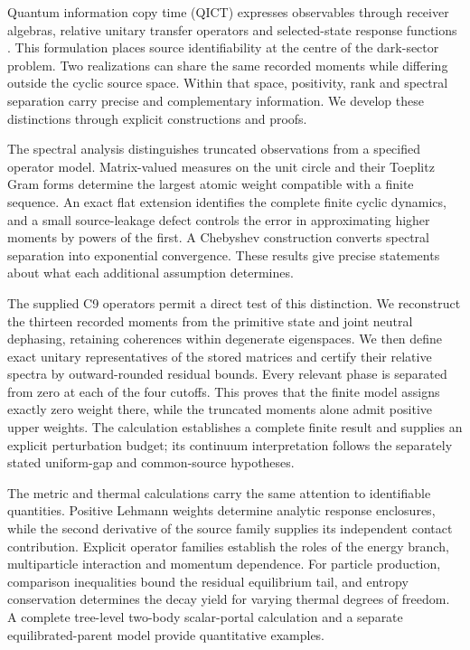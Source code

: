 \documentclass[11pt,a4paper]{article}
\numberwithin{equation}{section}
\begin{document}
Quantum information copy time (QICT) expresses observables through receiver algebras, relative unitary transfer operators and selected-state response functions \cite{QICT}. This formulation places source identifiability at the centre of the dark-sector problem. Two realizations can share the same recorded moments while differing outside the cyclic source space. Within that space, positivity, rank and spectral separation carry precise and complementary information. We develop these distinctions through explicit constructions and proofs.

The spectral analysis distinguishes truncated observations from a specified operator model. Matrix-valued measures on the unit circle and their Toeplitz Gram forms determine the largest atomic weight compatible with a finite sequence. An exact flat extension identifies the complete finite cyclic dynamics, and a small source-leakage defect controls the error in approximating higher moments by powers of the first. A Chebyshev construction converts spectral separation into exponential convergence. These results give precise statements about what each additional assumption determines.

The supplied C9 operators permit a direct test of this distinction. We reconstruct the thirteen recorded moments from the primitive state and joint neutral dephasing, retaining coherences within degenerate eigenspaces. We then define exact unitary representatives of the stored matrices and certify their relative spectra by outward-rounded residual bounds. Every relevant phase is separated from zero at each of the four cutoffs. This proves that the finite model assigns exactly zero weight there, while the truncated moments alone admit positive upper weights. The calculation establishes a complete finite result and supplies an explicit perturbation budget; its continuum interpretation follows the separately stated uniform-gap and common-source hypotheses.

The metric and thermal calculations carry the same attention to identifiable quantities. Positive Lehmann weights determine analytic response enclosures, while the second derivative of the source family supplies its independent contact contribution. Explicit operator families establish the roles of the energy branch, multiparticle interaction and momentum dependence. For particle production, comparison inequalities bound the residual equilibrium tail, and entropy conservation determines the decay yield for varying thermal degrees of freedom. A complete tree-level two-body scalar-portal calculation and a separate equilibrated-parent model provide quantitative examples.
\end{document}
